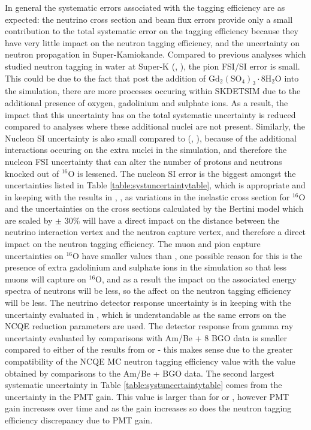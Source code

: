 In general the systematic errors associated with the tagging efficiency are as expected: the neutrino cross section and beam flux errors provide only a small contribution to the total systematic error on the tagging efficiency because they have very little impact on the neutron tagging efficiency, and the uncertainty on neutron propagation in Super-Kamiokande. Compared to previous analyses which studied neutron tagging in water at Super-K (\cite{tn415_fiacob}, \cite{akutsu_thesis}), the pion FSI/SI error is small. This could be due to the fact that post the addition of $\mathrm{Gd}_{2}\left(\mathrm{SO}_{4}\right)_{3} \cdot 8 \mathrm{H}_{2} \mathrm{O}$ into the simulation, there are more processes occuring within SKDETSIM due to the additional presence of oxygen, gadolinium and sulphate ions. As a result, the impact that this uncertainty has on the total systematic uncertainty is reduced compared to analyses where these additional nuclei are not present. Similarly, the Nucleon SI uncertainty is also small compared to (\cite{tn415_fiacob}, \cite{akutsu_thesis}), because of the additional interactions occuring on the extra nuclei in the simulation, and therefore the nucleon FSI uncertainty that can alter the number of protons and neutrons knocked out of ${ }^{16} \mathrm{O}$ is lessened. The nucleon SI error is the biggest amongst the uncertainties listed in Table \ref{table:systuncertaintytable}, which is appropriate and in keeping with the results in \cite{tn415_fiacob}, \cite{akutsu_thesis}, as variations in the inelastic cross section for ${ }^{16} \mathrm{O}$ and the uncertainties on the cross sections calculated by the Bertini model which are scaled by $\pm$ 30\% will have a direct impact on the distance between the neutrino interaction vertex and the neutron capture vertex, and therefore a direct impact on the neutron tagging efficiency. The muon and pion capture uncertainties on ${ }^{16} \mathrm{O}$ have smaller values than \cite{akutsu_thesis}, one possible reason for this is the presence of extra gadolinium and sulphate ions in the simulation so that less muons will capture on ${ }^{16} \mathrm{O}$, and as a result the impact on the associated energy spectra of neutrons will be less, so the affect on the neutron tagging efficiency will be less. The neutrino detector response uncertainty is in keeping with the uncertainty evaluated in \cite{tn415_fiacob}, which is understandable as the same errors on the NCQE reduction parameters are used. The detector response from gamma ray uncertainty evaluated by comparisons with Am/Be + 8 BGO data is smaller compared to either of the results from \cite{tn415_fiacob} or \cite{akutsu_thesis} - this makes sense due to the greater compatibility of the NCQE MC neutron tagging efficiency value with the value obtained by comparisons to the Am/Be + BGO data. The second largest systematic uncertainty in Table \ref{table:systuncertaintytable} comes from the uncertainty in the PMT gain. This value is larger than for \cite{tn415_fiacob} or \cite{akutsu_thesis}, however PMT gain increases over time and as the gain increases so does the neutron tagging efficiency discrepancy due to PMT gain.